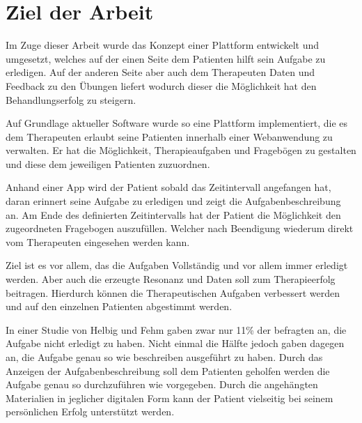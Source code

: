\section{Ziel der Arbeit}

Im Zuge dieser Arbeit wurde das Konzept einer Plattform entwickelt und umgesetzt, welches auf der einen Seite dem Patienten hilft sein Aufgabe zu erledigen. Auf der anderen Seite aber auch dem Therapeuten Daten und Feedback zu den Übungen liefert wodurch dieser die Möglichkeit hat den Behandlungserfolg zu steigern.

Auf Grundlage aktueller Software wurde so eine Plattform implementiert, die es dem Therapeuten erlaubt seine Patienten innerhalb einer Webanwendung zu verwalten. Er hat die Möglichkeit, Therapieaufgaben und Fragebögen zu gestalten und diese dem jeweiligen Patienten zuzuordnen.

Anhand einer App wird der Patient sobald das Zeitintervall angefangen hat, daran erinnert seine Aufgabe zu erledigen und zeigt die Aufgabenbeschreibung an. Am Ende des definierten Zeitintervalls hat der Patient die Möglichkeit den zugeordneten Fragebogen auszufüllen. Welcher nach Beendigung wiederum direkt vom Therapeuten eingesehen werden kann.

Ziel ist es vor allem, das die Aufgaben Vollständig und vor allem immer erledigt werden. Aber auch die erzeugte Resonanz und Daten soll zum Therapieerfolg beitragen. Hierdurch können die Therapeutischen Aufgaben verbessert werden und auf den einzelnen Patienten abgestimmt werden.

In einer Studie von Helbig und Fehm \cite{bibid} gaben zwar nur 11\% der befragten an, die Aufgabe nicht erledigt zu haben. Nicht einmal die Hälfte jedoch gaben dagegen an, die Aufgabe genau so wie beschreiben ausgeführt zu haben. Durch das Anzeigen der Aufgabenbeschreibung soll dem Patienten geholfen werden die Aufgabe genau so durchzuführen wie vorgegeben. Durch die angehängten Materialien in jeglicher digitalen Form kann der Patient vielseitig bei seinem persönlichen Erfolg unterstützt werden.

